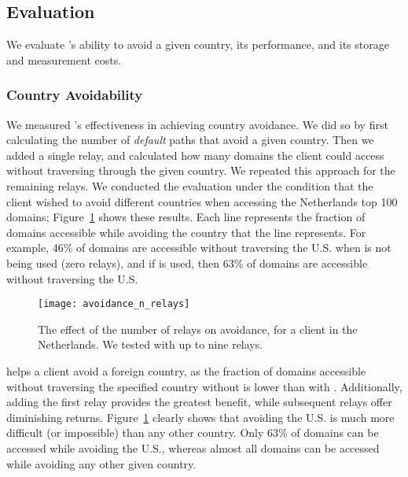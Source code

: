 \subsection{Evaluation}

We evaluate \system{}'s ability to avoid a given country, its performance,
and its storage and measurement costs.

\subsubsection{Country Avoidability}

We measured \system{}'s effectiveness in achieving country avoidance.  We did so by first 
calculating the number of {\it default} paths that avoid a given country.  Then 
we added a single relay, and calculated how many domains the client could 
access without traversing through the given country.  We repeated this approach for 
the remaining relays.  We conducted the evaluation under the condition that 
the client wished to avoid different countries when accessing the Netherlands top 
100 domains; Figure~\ref{fig:avoidance_eval} shows these results.  Each 
line represents the fraction of domains accessible while avoiding the country that 
the line represents.  For example, 46\% of domains are accessible without traversing 
the U.S. when \system{} is not being used (zero relays), and if \system{} is 
used, then 63\% of domains are accessible without traversing the U.S.

\begin{figure}[t!]
\tiny
\centering
\texttt{[image: avoidance\_n\_relays]}
\caption{The effect of the number of relays on avoidance, for a client
  in the Netherlands. We tested \system{} with up to nine relays.}
\label{fig:avoidance_eval}
\end{figure}

\system{} helps a client avoid a foreign country,
as the fraction of domains accessible without traversing the specified
country without \system{} is lower than with \system{}.  Additionally,
adding the first relay provides the greatest benefit, while subsequent
relays offer diminishing returns.  Figure~\ref{fig:avoidance_eval}
clearly shows that avoiding the U.S. is much more difficult (or
impossible) than any other country.  Only 63\% of domains can be
accessed while avoiding the U.S., whereas almost all domains can be
accessed while avoiding any other given country.

